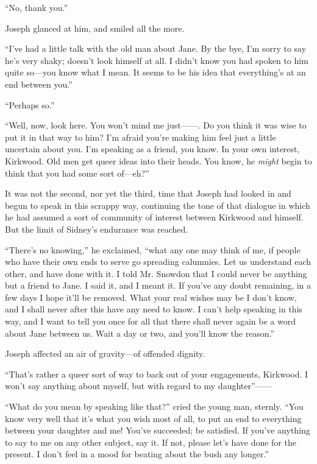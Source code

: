 ``No, thank you.''

Joseph glanced at him, and smiled all the more.

``I've had a little talk with the old man about Jane. By the bye, I'm
sorry to say he's very shaky; doesn't look himself at all. I didn't know
you had spoken to him quite so---you know what I mean. It seems to be
his idea that everything's at an end between you.''

``Perhaps so.''

``Well, now, look here. You won't mind me just{{------}}. Do you think
it was wise to put it in that way to him? I'm afraid you're making him
feel just a little uncertain about you. I'm speaking as a friend, you
know. In your own interest, Kirkwood. Old men get queer ideas
{\protect\hypertarget{112}{}{}}into their heads. You know, he
\emph{might} begin to think that you had some sort of---eh?''

It was not the second, nor yet the third, time that Joseph had looked in
and begun to speak in this scrappy way, continuing the tone of that
dialogue in which he had assumed a sort of community of interest between
Kirkwood and himself. But the limit of Sidney's endurance was reached.

``There's no knowing,'' he exclaimed, ``what any one may think of me, if
people who have their own ends to serve go spreading calumnies. Let us
understand each other, and have done with it. I told Mr. Snowdon that I
could never be anything but a friend to Jane. I said it, and I meant it.
If you've any doubt remaining, in a few days I hope it'll be removed.
What your real wishes may be I don't know, and I shall never after this
have any need to know. I can't help speaking in this way, and I want to
tell you once for all that there shall never again be a word about Jane
between us. Wait a day or two, and you'll know the reason.''

Joseph affected an air of gravity---of offended dignity.

{\protect\hypertarget{113}{}{}}``That's rather a queer sort of way to
back out of your engagements, Kirkwood. I won't say anything about
myself, but with regard to my daughter''{{------}}

``What do you mean by speaking like that?'' cried the young man,
sternly. ``You know very well that it's what you wish most of all, to
put an end to everything between your daughter and me! You've succeeded;
be satisfied. If you've anything to say to me on any other subject, say
it. If not, please let's have done for the present. I don't feel in a
mood for beating about the bush any longer.''

